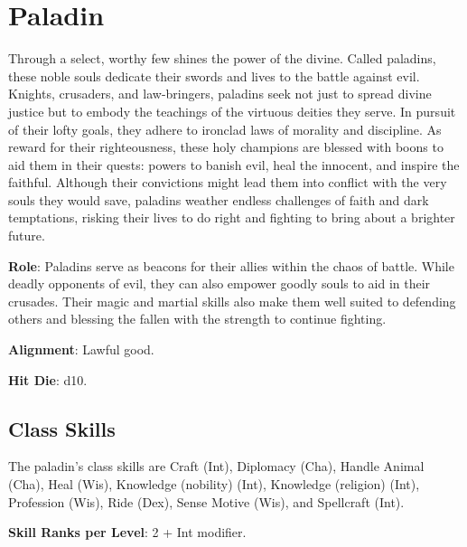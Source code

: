 \section{Paladin}

\label{f0}				
Through a select, worthy few shines the power of the divine. Called paladins, these noble souls dedicate their swords and lives to the battle against evil. Knights, crusaders, and law-bringers, paladins seek not just to spread divine justice but to embody the teachings of the virtuous deities they serve. In pursuit of their lofty goals, they adhere to ironclad laws of morality and discipline. As reward for their righteousness, these holy champions are blessed with boons to aid them in their quests: powers to banish evil, heal the innocent, and inspire the faithful. Although their convictions might lead them into conflict with the very souls they would save, paladins weather endless challenges of faith and dark temptations, risking their lives to do right and fighting to bring about a brighter future. 
				
\textbf{Role}: Paladins serve as beacons for their allies within the chaos of battle. While deadly opponents of evil, they can also empower goodly souls to aid in their crusades. Their magic and martial skills also make them well suited to defending others and blessing the fallen with the strength to continue fighting.
				
\textbf{Alignment}: Lawful good.
				
\textbf{Hit Die}: d10.
				
\subsection{Class Skills}

				
The paladin's class skills are Craft (Int), Diplomacy (Cha), Handle Animal (Cha), Heal (Wis), Knowledge (nobility) (Int), Knowledge (religion) (Int), Profession (Wis), Ride (Dex), Sense Motive (Wis), and Spellcraft (Int).
				
\textbf{Skill Ranks per Level}: 2 + Int modifier.


